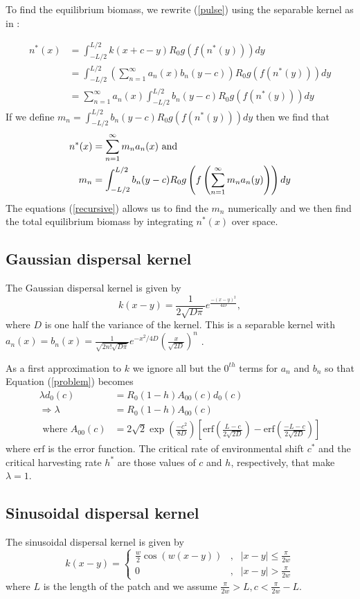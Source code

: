 \documentclass[12pt,english]{article}
\begin{document}
To find the equilibrium biomass, we rewrite (\ref{pulse}) using the separable kernel as in \cite{Latore:1998fk}:

\begin{align*}
 n^*(x)&=\int_{-L/2}^{L/2}k(x+c-y)R_0g(f(n^*(y)))dy
 \\&= \int_{-L/2}^{L/2}\left(\sum_{n=1}^\infty a_n(x)b_n(y-c)\right)R_0g(f(n^*(y)))dy
  \\&=\sum_{n=1}^\infty a_n(x) \int_{-L/2}^{L/2}b_n(y-c)R_0g(f(n^*(y)))dy
\end{align*}
If we define $m_n=\int_{-L/2}^{L/2}b_n(y-c)R_0g(f(n^*(y)))dy$ then we find that 
\begin{align}
n^*(x)&=\sum_{n=1}^\infty m_na_n(x) \text { and } \notag
\\m_n&=\int_{-L/2}^{L/2}b_n(y-c)R_0g\left(f\left(\sum_{n=1}^\infty m_na_n(y)\right)\right)dy \label{recursive}
\end{align}
The equations (\ref{recursive}) allows us to find the $m_n$ numerically and we then find the total equilibrium biomass by integrating $n^*(x)$ over space.

\subsection{Gaussian dispersal kernel \label{gausapp}}
The Gaussian dispersal kernel is given by
$$k(x-y)=\frac{1}{2\sqrt{D\pi}}e^{\frac{-(x-y)^2}{4D}},$$
where $D$ is one half the variance of the kernel.
This is a separable kernel with
$a_n(x)=b_n(x)=\frac{1}{\sqrt{2n!\sqrt{D\pi}}}e^{-x^2/4D}\left(\frac{x}{\sqrt{2D}}\right)^n$ \citep{Latore:1998fk}.

As a first approximation to $k$ we ignore all but the $0^{th}$ terms for $a_n$ and $b_n$ so that Equation (\ref{problem}) becomes
\begin{align*}
\lambda d_0(c)&=R_0(1-h)A_{00}(c)d_0(c)
\\ \Rightarrow \lambda&=R_0(1-h)A_{00}(c)
\\\text{ where } A_{00}(c)&=2\sqrt{2}\exp\left(\frac{-c^2}{8D}\right)\left[\text{erf}\left(\frac{L-c}{2\sqrt{2D}}\right)-\text{erf}\left(\frac{-L-c}{2\sqrt{2D}}\right)\right]
\end{align*}
where $\text{erf}$ is the error function.  The critical rate of environmental shift $c^*$ and the critical harvesting rate $h^*$ are those values of $c$ and $h$, respectively, that make $\lambda=1$.

\subsection{Sinusoidal dispersal kernel \label{sinapp}}
The sinusoidal dispersal kernel is given by 
$$k(x-y)=\left\{\begin{array}{ccccc}
\frac{w}{2}\cos(w(x-y)) & , & |x-y|\leq\frac{\pi}{2w}
\\ 0 & , & |x-y|>\frac{\pi}{2w}
\end{array}\right.
$$
where $L$ is the length of the patch and we assume $\frac{\pi}{2w}>L,c<\frac{\pi}{2w}-L$.
\end{document}
